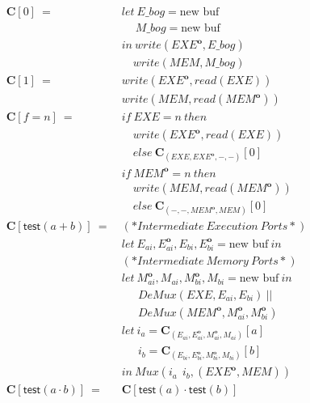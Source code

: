 \documentclass[sigconf,usenames,dvipsnames,svgnames,table]{acmart}
\newcommand{\obf}[1]{#1^\mathbf{o}}
\begin{document}
        \begin{figure}
          \begin{align*}
            \mathbf{C}[0]\ 
              =\ &
              let\    E\_bog = \text{new buf}\\
              &\quad\ M\_bog = \text{new buf}\\
              &in\ write(\obf{EXE}, E\_bog)\\
              &\quad  write(MEM, M\_bog)\\
            \mathbf{C}[1]\ 
              =\ &
              write(\obf{EXE}, read(EXE))\\
              &write(MEM, read(\obf{MEM}))
              \\
            \mathbf{C}[f = n]\
              =\
              &if\ EXE=n\ then\\
              &\quad write(\obf{EXE}, read(EXE))\\
              &\quad else\ \mathbf{C}_{(EXE, \obf{EXE}, -, -)}[0]\\
              &if\ \obf{MEM}=n\ then\\
              &\quad write(MEM, read(\obf{MEM}))\\
              &\quad else\ \mathbf{C}_{(-, -, \obf{MEM}, MEM)}[0]\\
            \mathbf{C}[\mathsf{test}(a + b)]\ 
              =\
              & (*Intermediate\ Execution\ Ports*)\\
              & let\ E_{ai}, \obf{E}_{ai}, E_{bi}, \obf{E}_{bi} = \text{new buf}\ in\\
              & (*Intermediate\ Memory\ Ports*)\\
              & let\ \obf{M}_{ai}, M_{ai}, \obf{M}_{bi}, M_{bi} = \text{new buf}\ in\\
              &\quad\ \ DeMux(EXE, E_{ai}, E_{bi})\ ||\\
              &\quad\ \ DeMux(\obf{MEM}, \obf{M}_{ai}, \obf{M}_{bi})\\
              &let\     i_a = \mathbf{C}_{(E_{ai},\obf{E}_{ai},\obf{M}_{ai},M_{ai})}[a]\\
              &\quad\ \ i_b = \mathbf{C}_{(E_{bi},\obf{E}_{bi},\obf{M}_{bi},M_{bi})}[b]\\
              &in\ Mux(i_a\ \ i_b, (\obf{EXE},MEM))\\
            \mathbf{C}[\mathsf{test}(a \cdot b)]\ 
              =\ &\mathbf{C}[\mathsf{test}(a) \cdot \mathsf{test}(b)] \\

\end{align*}
\end{figure}
\end{document}
